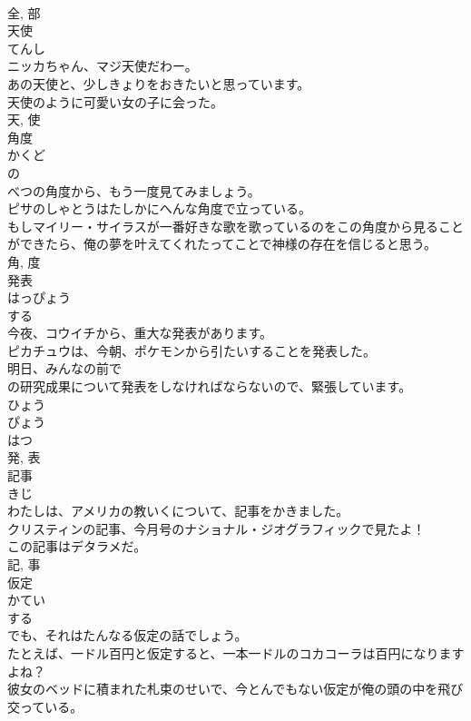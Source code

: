 \documentclass[8pt]{extreport}
\begin{document}
\begin{CJK}{UTF8}{min}
\\	全, 部	
\\	天使	
\\	てんし	
\\	ニッカちゃん、マジ天使だわー。	
\\	あの天使と、少しきょりをおきたいと思っています。	
\\	天使のように可愛い女の子に会った。	
\\	天, 使	
\\	角度	
\\	かくど	
\\	の 
\\	べつの角度から、もう一度見てみましょう。	
\\	ピサのしゃとうはたしかにへんな角度で立っている。	
\\	もしマイリー・サイラスが一番好きな歌を歌っているのをこの角度から見ることができたら、俺の夢を叶えてくれたってことで神様の存在を信じると思う。	
\\	角, 度	
\\	発表	
\\	はっぴょう	
\\	する 
\\	今夜、コウイチから、重大な発表があります。	
\\	ピカチュウは、今朝、ポケモンから引たいすることを発表した。	
\\	明日、みんなの前で
\\	の研究成果について発表をしなければならないので、緊張しています。	
\\	ひょう 
\\	ぴょう 
\\	はつ 
\\	発, 表	
\\	記事	
\\	きじ	
\\	わたしは、アメリカの教いくについて、記事をかきました。	
\\	クリスティンの記事、今月号のナショナル・ジオグラフィックで見たよ！	
\\	この記事はデタラメだ。	
\\	記, 事	
\\	仮定	
\\	かてい	
\\	する 
\\	でも、それはたんなる仮定の話でしょう。	
\\	たとえば、一ドル百円と仮定すると、一本一ドルのコカコーラは百円になりますよね？	
\\	彼女のベッドに積まれた札束のせいで、今とんでもない仮定が俺の頭の中を飛び交っている。	

\end{CJK}
\end{document}
